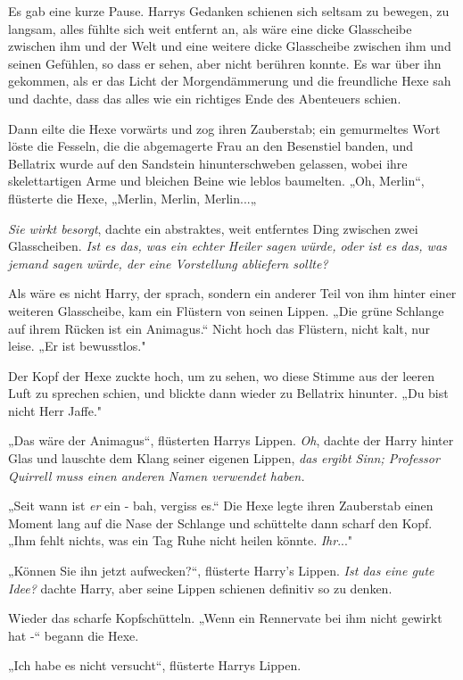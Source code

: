 {Es gab eine kurze Pause. Harrys Gedanken schienen sich seltsam zu bewegen, zu langsam, alles fühlte sich weit entfernt an, als wäre eine dicke Glasscheibe zwischen ihm und der Welt und eine weitere dicke Glasscheibe zwischen ihm und seinen Gefühlen, so dass er sehen, aber nicht berühren konnte. Es war über ihn gekommen, als er das Licht der Morgendämmerung und die freundliche Hexe sah und dachte, dass das alles wie ein richtiges Ende des Abenteuers schien.

Dann eilte die Hexe vorwärts und zog ihren Zauberstab; ein gemurmeltes Wort löste die Fesseln, die die abgemagerte Frau an den Besenstiel banden, und Bellatrix wurde auf den Sandstein hinunterschweben gelassen, wobei ihre skelettartigen Arme und bleichen Beine wie leblos baumelten. „Oh, Merlin“, flüsterte die Hexe, „Merlin, Merlin, Merlin...„

\emph{Sie wirkt besorgt}, dachte ein abstraktes, weit entferntes Ding zwischen zwei Glasscheiben. \emph{Ist es das, was ein echter Heiler sagen würde, oder ist es das, was jemand sagen würde, der eine Vorstellung abliefern sollte?}

Als wäre es nicht Harry, der sprach, sondern ein anderer Teil von ihm hinter einer weiteren Glasscheibe, kam ein Flüstern von seinen Lippen. „Die grüne Schlange auf ihrem Rücken ist ein Animagus.“ Nicht hoch das Flüstern, nicht kalt, nur leise. „Er ist bewusstlos."

Der Kopf der Hexe zuckte hoch, um zu sehen, wo diese Stimme aus der leeren Luft zu sprechen schien, und blickte dann wieder zu Bellatrix hinunter. „Du bist nicht Herr Jaffe."

„Das wäre der Animagus“, flüsterten Harrys Lippen. \emph{Oh}, dachte der Harry hinter Glas und lauschte dem Klang seiner eigenen Lippen, \emph{das ergibt Sinn; Professor Quirrell muss einen anderen Namen verwendet haben.}

„Seit wann ist \emph{er} ein - bah, vergiss es.“ Die Hexe legte ihren Zauberstab einen Moment lang auf die Nase der Schlange und schüttelte dann scharf den Kopf. „Ihm fehlt nichts, was ein Tag Ruhe nicht heilen könnte. \emph{Ihr}..."

„Können Sie ihn jetzt aufwecken?“, flüsterte Harry's Lippen. \emph{Ist das eine gute Idee?} dachte Harry, aber seine Lippen schienen definitiv so zu denken.

Wieder das scharfe Kopfschütteln. „Wenn ein Rennervate bei ihm nicht gewirkt hat -“ begann die Hexe.

„Ich habe es nicht versucht“, flüsterte Harrys Lippen.

}

